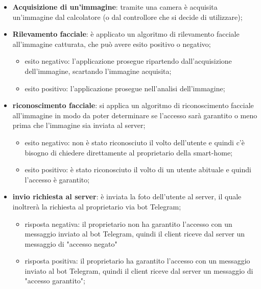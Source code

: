 \begin{itemize}
	\item \textbf{Acquisizione di un'immagine}: tramite una camera è acquisita un'immagine dal calcolatore (o dal controllore che si decide di utilizzare);
	\item \textbf{Rilevamento facciale}: è applicato un algoritmo di rilevamento facciale all'immagine catturata, che può avere esito positivo o negativo;
	\begin{itemize}
		\item esito negativo: l'applicazione prosegue ripartendo dall'acquisizione dell'immagine, scartando l'immagine acquisita;
		\item esito positivo: l'applicazione prosegue nell'analisi dell'immagine;
	\end{itemize}
	\item \textbf{riconoscimento facciale}: si applica un algoritmo di riconoscimento facciale all'immagine in modo da poter determinare se l'accesso sarà garantito o meno prima che l'immagine sia inviata al server;
	\begin{itemize}
		\item esito negativo: non è stato riconosciuto il volto dell'utente e quindi c'è bisogno di chiedere direttamente al proprietario della smart-home;
		\item esito positivo: è stato riconosciuto il volto di un utente abituale e quindi l'accesso è garantito;
	\end{itemize}
	\item \textbf{invio richiesta al server}: è inviata la foto dell'utente al server, il quale inoltrerà la richiesta al proprietario via bot Telegram;
	\begin{itemize}
		\item risposta negativa: il proprietario non ha garantito l'accesso con un messaggio inviato al bot Telegram, quindi il client riceve dal server un messaggio di "accesso negato"
		\item risposta positiva: il proprietario ha garantito l'accesso con un messaggio inviato al bot Telegram, quindi il client riceve dal server un messaggio di "accesso garantito";
	\end{itemize}
\end{itemize}



